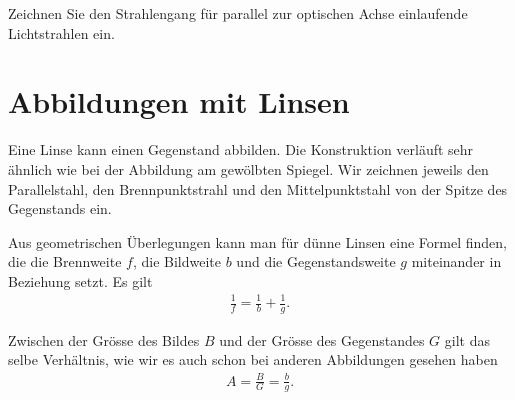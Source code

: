 \documentclass[paper=a4,twoside=true,,DIV13,BCOR1cm]{scrartcl}
\begin{document}
\begin{aufgabe}
	Zeichnen Sie den Strahlengang für parallel zur optischen Achse einlaufende Lichtstrahlen ein.
\end{aufgabe}

\begin{center}
\end{center}

\section{Abbildungen mit Linsen}
Eine Linse kann einen Gegenstand abbilden. Die Konstruktion verläuft sehr ähnlich
wie bei der Abbildung am gewölbten Spiegel. Wir zeichnen jeweils den Parallelstahl,
den Brennpunktstrahl und den Mittelpunktstahl von der Spitze des Gegenstands ein.



Aus geometrischen Überlegungen kann man für dünne Linsen eine Formel finden,
die die Brennweite $f$, die Bildweite $b$ und die Gegenstandsweite $g$ miteinander
in Beziehung setzt. Es gilt
\begin{eqnarray*}
	\frac{1}{f} = \frac{1}{b} + \frac{1}{g}\text{.}
\end{eqnarray*}

Zwischen der Grösse des Bildes $B$ und der Grösse des Gegenstandes $G$ gilt das selbe Verhältnis,
wie wir es auch schon bei anderen Abbildungen gesehen haben
\begin{eqnarray*}
	A = \frac{B}{G} = \frac{b}{g}\text{.}
\end{eqnarray*}
\end{document}
